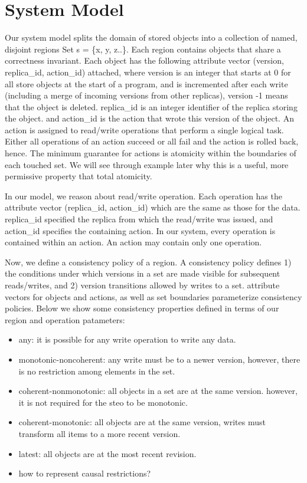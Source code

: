 \documentclass[preprint, numbers]{sigplanconf}
\begin{document}
\section{System Model}

Our system model splits the domain of stored objects into a collection of named,
disjoint regions Set s = \{x, y, z..\}. Each
region contains objects that share a correctness invariant. 
Each object has the following attribute vector (version, replica\_id, action\_id) attached,  where
version is an integer that starts at 0 for all store objects at the start of a
program, and is incremented after each write (including a merge of incoming
versions from other replicas), version -1 means that the object is deleted.
replica\_id is an integer identifier of the replica storing the object. and
action\_id is the action that wrote this version of the object. An action is
assigned to read/write operations that perform a single logical task. Either all
operations of an action succeed or all fail and the action is rolled back,
hence. The minimum guarantee for actions is atomicity within the boundaries of
each touched set. We will see through example later why this is a useful, more
permissive property that total atomicity.

In our model, we reason about read/write operation. Each operation has the
attribute vector (replica\_id, action\_id) which are the same as those for the
data. replica\_id specified the replica from which the read/write was issued,
and action\_id specifies the containing action. In our system, every operation
is contained within an action. An action may contain only one operation.

Now, we define a consistency policy of a region. A consistency policy defines 1)
the conditions under which versions in a set are made visible for subsequent
reads/writes, and 2) version transitions allowed by writes to a set. attribute
vectors for objects and actions, as well as set boundaries parameterize
consistency policies. Below we show some consistency properties defined
in terms of our region and operation patameters:

\begin{itemize}
  \item any: it is possible for any write operation to write any data.
  \item monotonic-noncoherent: any write must be to a newer version, however,
    there is no restriction among elements in the set.
  \item coherent-nonmonotonic: all objects in a set are at the same version.
    however, it is not required for the steo to be monotonic.
  \item coherent-monotonic: all objects are at the same version, writes must
    transform all items to a more recent version.
  \item latest: all objects are at the most recent revision.
  \item how to represent causal restrictions? 
\end{itemize}
\end{document}
